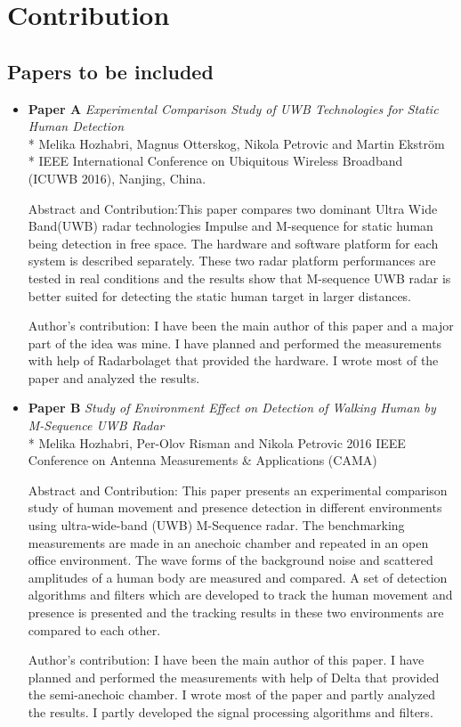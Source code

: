 \section{Contribution}

\subsection{Papers to be included}
\label{papers}
\begin{itemize}
	\item \textbf{Paper A} \textit{Experimental Comparison Study of UWB Technologies for Static Human Detection}\\*
	Melika Hozhabri, Magnus Otterskog, Nikola Petrovic and Martin Ekstr\"{o}m\\*
	IEEE International Conference on Ubiquitous Wireless Broadband (ICUWB 2016), Nanjing, China.
	
	Abstract and Contribution:This paper compares two dominant Ultra Wide Band(UWB) radar technologies Impulse and M-sequence for static human being detection in free space. The hardware and software platform for each system is described separately. These two radar platform performances are tested in real conditions and the results show that M-sequence UWB radar is better suited for detecting the static human target in larger distances.
	
	Author's contribution:
	I have been the main author of this paper and a major part of the idea was mine. I have planned and performed the measurements with help of Radarbolaget that provided the hardware. I wrote most of the paper and analyzed the results.
	
	\item \textbf{Paper B} \textit{Study of Environment Effect on Detection of
		Walking Human by M-Sequence UWB Radar }\\*
		Melika Hozhabri, Per-Olov Risman and Nikola Petrovic
		2016 IEEE Conference on Antenna Measurements \& Applications (CAMA)
		
	Abstract and Contribution: This paper presents an experimental comparison study of human movement and presence detection in different environments using ultra-wide-band (UWB) M-Sequence radar. The benchmarking measurements are made in an anechoic chamber and repeated in an open office environment. The wave forms of the background noise and scattered amplitudes of a human body are measured and compared. A set of detection algorithms and filters which are developed to track the human movement and presence is presented and the tracking results in these two environments are compared to each other.

	Author's contribution:
	I have been the main author of this paper. I have planned and performed the measurements with help of Delta that provided the semi-anechoic chamber. I wrote most of the paper and partly analyzed the results. I partly developed the signal processing algorithms and filters.  
\end{itemize}
